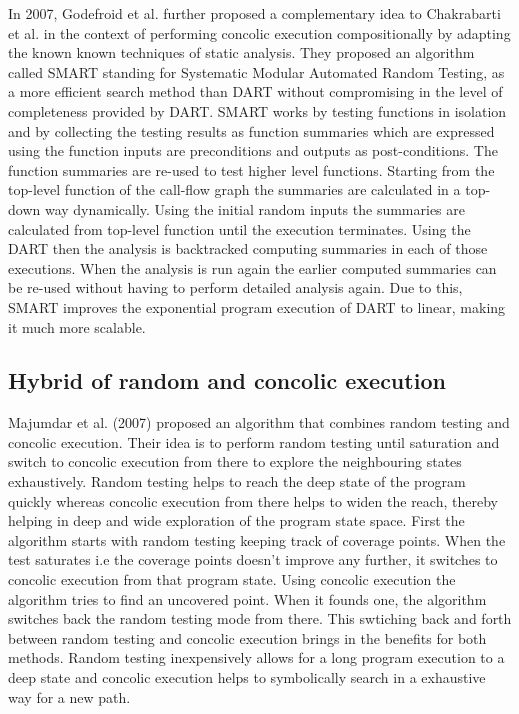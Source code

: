 \documentclass[	runningheads,
				a4paper]{llncs}
\begin{document}
In 2007, Godefroid et al. \cite{godefroid2007compositional} further proposed a complementary idea \cite{godefroid2007compositional} to Chakrabarti et al. \cite{chakrabarti2006software} in the context of performing concolic execution compositionally by adapting the known known techniques of static analysis. 
They proposed an algorithm called SMART standing for Systematic Modular Automated Random Testing, as a more efficient search method than DART \cite{godefroid2005dart} without compromising in the level of completeness provided by DART. SMART works by testing functions in isolation and by collecting the testing results as function summaries which are expressed using the function inputs are preconditions and outputs as post-conditions. The function summaries are re-used to test higher level functions. Starting from the top-level function of the call-flow graph the summaries are calculated in a top-down way dynamically. Using the initial random inputs the summaries are calculated from top-level function until the execution terminates. Using the DART then the analysis is backtracked computing summaries in each of those executions. When the analysis is run again the earlier computed summaries can be re-used without having to perform detailed analysis again. Due to this, SMART improves the exponential program execution of DART to linear, making it much more scalable.


\subsection{Hybrid of random and concolic execution}
Majumdar et al. (2007) \cite{majumdar2007hybrid} proposed an algorithm that combines random testing and concolic execution. Their idea is to perform random testing until saturation and switch to concolic execution from there to explore the neighbouring states exhaustively. Random testing helps to reach the deep state of the program quickly whereas concolic execution from there helps to widen the reach, thereby helping in deep and wide exploration of the program state space. First the algorithm starts with random testing keeping track of coverage points. When the test saturates i.e the coverage points doesn't improve any further, it switches to concolic execution from that program state. Using concolic execution the algorithm tries to find an uncovered point. When it founds one, the algorithm switches back the random testing mode from there. This swtiching back and forth between random testing and concolic execution brings in the benefits for both methods. Random testing inexpensively allows for a long program execution to a deep state and concolic execution helps to symbolically search in a exhaustive way for a new path.
\end{document}
